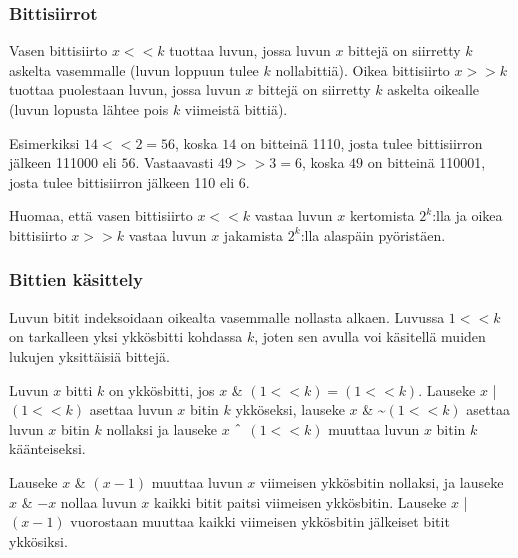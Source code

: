 \subsubsection{Bittisiirrot}

Vasen bittisiirto $x < < k$ tuottaa luvun, jossa luvun $x$ bittejä
on siirretty $k$ askelta vasemmalle
(luvun loppuun tulee $k$ nollabittiä).
Oikea bittisiirto $x > > k$ tuottaa puolestaan
luvun, jossa luvun $x$ bittejä
on siirretty $k$ askelta oikealle 
(luvun lopusta lähtee pois $k$ viimeistä bittiä).

Esimerkiksi $14 < < 2 = 56$,
koska $14$ on bitteinä 1110,
josta tulee bittisiirron jälkeen 111000 eli $56$.
Vastaavasti $49 > > 3 = 6$,
koska $49$ on bitteinä 110001,
josta tulee bittisiirron jälkeen 110 eli $6$.

Huomaa, että vasen bittisiirto $x < < k$
vastaa luvun $x$ kertomista $2^k$:lla
ja oikea bittisiirto $x > > k$
vastaa luvun $x$ jakamista $2^k$:lla
alaspäin pyöristäen.

\subsubsection{Bittien käsittely}

Luvun bitit indeksoidaan oikealta vasemmalle
nollasta alkaen.
Luvussa $1 < < k$ on tarkalleen yksi ykkösbitti
kohdassa $k$, joten sen avulla voi käsitellä
muiden lukujen yksittäisiä bittejä.

Luvun $x$ bitti $k$ on ykkösbitti, jos
$x$ \& $(1 < < k) = (1 < < k)$.
Lauseke $x$ | $(1 < < k)$ asettaa luvun $x$ bitin $k$
ykköseksi, lauseke
$x$ \& \textasciitilde $(1 < < k)$
asettaa luvun $x$ bitin $k$ nollaksi ja
lauseke $x$ $\XOR$ $(1 < < k)$
muuttaa luvun $x$ bitin $k$ käänteiseksi.
% 
% 
% 

Lauseke $x$ \& $(x-1)$ muuttaa luvun $x$ viimeisen
ykkösbitin nollaksi, ja lauseke $x$ \& $-x$ nollaa
luvun $x$ kaikki bitit paitsi viimeisen ykkösbitin.
Lauseke $x$ | $(x-1)$ vuorostaan muuttaa kaikki
viimeisen ykkösbitin jälkeiset bitit ykkösiksi.

